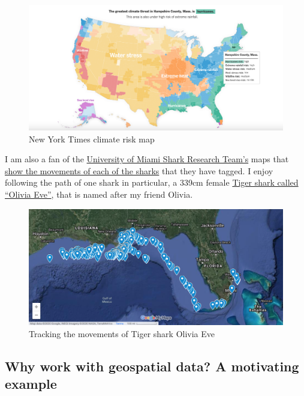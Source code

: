 \documentclass[12pt]{article}
\begin{document}
\begin{figure}

{\centering \includegraphics[width=0.8\linewidth]{images/NYT-climate-risk-map} 

}

\caption{New York Times climate risk map}\label{fig:unnamed-chunk-1}
\end{figure}

I am also a fan of the
\href{https://sharkresearch.rsmas.miami.edu/}{University of Miami Shark
Research Team's} maps that
\href{https://sharkresearch.rsmas.miami.edu/education/virtual-learning/tracking-sharks/}{show
the movements of each of the sharks} that they have tagged. I enjoy
following the path of one shark in particular, a 339cm female
\href{https://sharkresearch.rsmas.miami.edu/education/virtual-learning/tracking-sharks/olivia-eve/}{Tiger
shark called ``Olivia Eve''}, that is named after my friend Olivia.

\begin{figure}

{\centering \includegraphics[width=0.8\linewidth]{images/olivia-eve-shark-map} 

}

\caption{Tracking the movements of Tiger shark Olivia Eve}\label{fig:unnamed-chunk-2}
\end{figure}

\hypertarget{why-work-with-geospatial-data-a-motivating-example}{%
\subsection{Why work with geospatial data? A motivating
example}\label{why-work-with-geospatial-data-a-motivating-example}}
\end{document}
